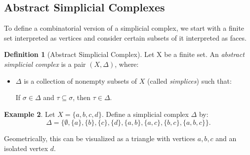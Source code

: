 \documentclass[11pt]{article}
\theoremstyle{definition}
\newtheorem{definition}{Definition}[section]
\newtheorem{example}[definition]{Example}
\theoremstyle{plain}
\begin{document}
\subsection{Abstract Simplicial Complexes}

To define a combinatorial version of a simplicial complex, we start with a finite set interpreted as vertices and consider certain subsets of it interpreted as faces.


\begin{definition}[Abstract Simplicial Complex]
    Let X be a finite set. An \emph{abstract simplicial complex} is a pair $(X, \Delta)$, where:
    \begin{itemize}
        \item $\Delta$ is a collection of nonempty subsets of $X$ (called \emph{simplices}) such that:

              If $\sigma \in \Delta$ and $\tau \subseteq \sigma$, then $\tau \in \Delta$.

    \end{itemize}
\end{definition}

\begin{example}
    Let $X = \{a, b, c, d\}$. Define a simplicial complex $\Delta$ by:
    \[
        \Delta = \{ \emptyset, \{a\}, \{b\}, \{c\}, \{d\}, \{a,b\}, \{a,c\}, \{b,c\}, \{a,b,c\} \}.
    \]
\end{example}
Geometrically, this can be visualized as a triangle with vertices $a, b, c$ and an isolated vertex $d$.
\begin{center}
\end{center}
\end{document}
